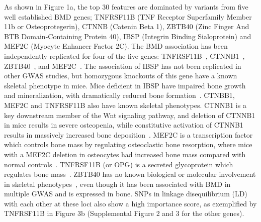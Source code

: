 \documentclass[10pt,letterpaper]{article}
\begin{document}
As shown in Figure 1a, the top 30 features are dominated by variants from five well established BMD genes; TNFRSF11B (TNF Receptor Superfamily Member 11b or Osteoprotegerin), CTNNB (Catenin Beta 1), ZBTB40 (Zinc Finger And BTB Domain-Containing Protein 40), IBSP (Integrin Binding Sialoprotein) and MEF2C (Myocyte Enhancer Factor 2C). 
The BMD association has been independently replicated for four of the five genes: TNFRSF11B~\cite{Rivadeneira2009,Zhang2014,Kemp2014,Paternoster2013}, CTNNB1~\cite{Pei2016, Rivadeneira2009}, ZBTB40~\cite{Rivadeneira2009,  Zhang2014,Nielson2016}, and MEF2C~\cite{Pei2016a}. 
The association of IBSP has not been replicated in other GWAS studies, but homozygous knockouts of this gene have a known skeletal phenotype in mice. Mice deficient in IBSP have impaired bone growth and mineralization, with dramatically reduced bone formation~\cite{Malaval2008}. 
CTNBB1, MEF2C and TNFRSF11B also have known skeletal phenotypes. 
CTNNB1 is a key downstream member of the Wnt signaling pathway, and deletion of CTNNB1 in mice results in severe osteopenia, while constitutive activation of CTNNB1 results in massively increased bone deposition~\cite{Holmen2005}. 
MEF2C is a transcription factor which controls bone mass by regulating osteoclastic bone resorption, where mice with a MEF2C deletion in osteocytes had increased bone mass compared with normal controls~\cite{Kramer2012}. TNFRSF11B (or OPG) is a secreted glycoprotein which regulates bone mass~\cite{Simonet1997}. 
ZBTB40 has no known biological or molecular involvement in skeletal phenotypes~\cite{Styrkarsdottir2008}, even though it has been associated with BMD in multiple GWAS and is expressed in bone.
SNPs in linkage disequilibrium (LD) with each other at these loci also show a high importance score, as exemplified by TNFRSF11B in Figure 3b (Supplemental Figure 2 and 3 for the other genes). %

\end{document}
